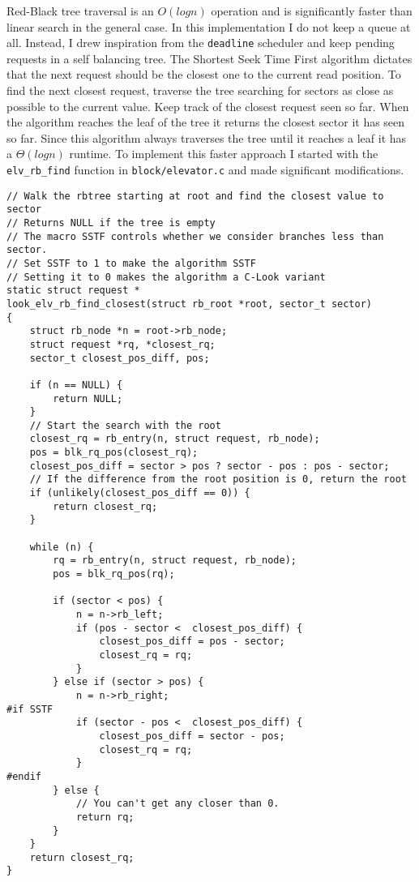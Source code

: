 \documentclass[10pt,conference,draftclsnofoot,onecolumn]{IEEEtran}
\begin{document}
Red-Black tree traversal is an $O(log n)$ operation and is significantly faster than linear search in the general case. In this implementation I do not keep a queue at all. Instead, I drew inspiration from the \texttt{deadline} scheduler and keep pending requests in a self balancing tree. The Shortest Seek Time First algorithm dictates that the next request should be the closest one to the current read position. To find the next closest request, traverse the tree searching for sectors as close as possible to the current value. Keep track of the closest request seen so far. When the algorithm reaches the leaf of the tree it returns the closest sector it has seen so far. Since this algorithm always traverses the tree until it reaches a leaf it has a $\Theta(log n)$ runtime. To implement this faster approach I started with the \texttt{elv\_rb\_find} function in \texttt{block/elevator.c} and made significant modifications.

\begin{lstlisting}
// Walk the rbtree starting at root and find the closest value to sector
// Returns NULL if the tree is empty
// The macro SSTF controls whether we consider branches less than sector.
// Set SSTF to 1 to make the algorithm SSTF
// Setting it to 0 makes the algorithm a C-Look variant
static struct request *
look_elv_rb_find_closest(struct rb_root *root, sector_t sector)
{
	struct rb_node *n = root->rb_node;
	struct request *rq, *closest_rq;
	sector_t closest_pos_diff, pos;

	if (n == NULL) {
		return NULL;
	}
	// Start the search with the root
	closest_rq = rb_entry(n, struct request, rb_node);
	pos = blk_rq_pos(closest_rq);
	closest_pos_diff = sector > pos ? sector - pos : pos - sector;
	// If the difference from the root position is 0, return the root
	if (unlikely(closest_pos_diff == 0)) {
		return closest_rq;
	}

	while (n) {
		rq = rb_entry(n, struct request, rb_node);
		pos = blk_rq_pos(rq);

		if (sector < pos) {
			n = n->rb_left;
			if (pos - sector <  closest_pos_diff) {
				closest_pos_diff = pos - sector;
				closest_rq = rq;
			}
		} else if (sector > pos) {
			n = n->rb_right;
#if SSTF
			if (sector - pos <  closest_pos_diff) {
				closest_pos_diff = sector - pos;
				closest_rq = rq;
			}
#endif
		} else {
			// You can't get any closer than 0.
			return rq;
		}
	}
	return closest_rq;
}
\end{lstlisting}
\end{document}
